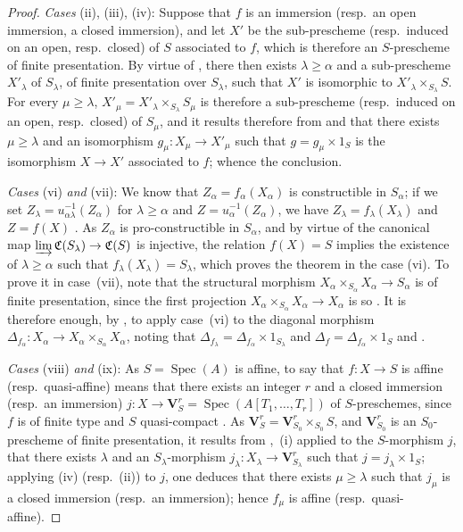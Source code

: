 \begin{proof}
\emph{Cases} (ii), (iii), (iv): Suppose that $f$ is an immersion (resp.\ an open immersion, a closed immersion), and let $X'$ be the sub-prescheme (resp.\ induced on an open, resp.\ closed) of $S$ associated to $f$, which is therefore an $S$-prescheme of finite presentation.
By virtue of , there then exists $\lambda\geqslant\alpha$ and a sub-prescheme $X'_\lambda$ of $S_\lambda$, of finite presentation over $S_\lambda$, such that $X'$ is isomorphic to $X'_\lambda\times_{S_\lambda}S$.
For every $\mu\geqslant\lambda$, $X'_\mu=X'_\lambda\times_{S_\lambda}S_\mu$ is therefore a sub-prescheme (resp.\ induced on an open, resp.\ closed) of $S_\mu$, and it results therefore from  and  that there exists $\mu\geqslant\lambda$ and an isomorphism $g_\mu:X_\mu\to X'_\mu$ such that $g=g_\mu\times 1_S$ is the isomorphism $X\to X'$ associated to $f$; whence the conclusion.

\emph{Cases} (vi) \emph{and} (vii): We know  that $Z_\alpha=f_\alpha(X_\alpha)$ is constructible in $S_\alpha$; if we set $Z_\lambda=u_{\alpha\lambda}^{-1}(Z_\alpha)$ for $\lambda\geqslant\alpha$ and $Z=u_\alpha^{-1}(Z_\alpha)$, we have $Z_\lambda=f_\lambda(X_\lambda)$ and $Z=f(X)$ .
As $Z_\alpha$ is pro-constructible in $S_\alpha$, and by virtue of  the canonical map $\varinjlim\mathfrak{C}(S_\lambda)\to\mathfrak{C}(S)$ is injective, the relation $f(X)=S$ implies the existence of $\lambda\geqslant\alpha$ such that $f_\lambda(X_\lambda)=S_\lambda$, which proves the theorem in the case (vi).
To prove it in case~(vii), note that the structural morphism $X_\alpha\times_{S_\alpha}X_\alpha\to S_\alpha$ is of finite presentation, since the first projection $X_\alpha\times_{S_\alpha}X_\alpha\to X_\alpha$ is so . It is therefore enough, by , to apply case~(vi) to the diagonal morphism $\Delta_{f_\alpha}:X_\alpha\longrightarrow X_\alpha\times_{S_\alpha}X_\alpha$,
noting that $\Delta_{f_\lambda}=\Delta_{f_\alpha}\times1_{S_\lambda}$ and $\Delta_f=\Delta_{f_\alpha}\times1_S$  and .

\emph{Cases} (viii) \emph{and} (ix): As $S=\operatorname{Spec}(A)$ is affine, to say that $f:X\to S$ is affine (resp.\ quasi-affine) means that there exists an integer $r$ and a closed immersion (resp.\ an immersion) $j:X\to\mathbf{V}^r_S=\operatorname{Spec}(A[T_1,\ldots,T_r])$ of $S$-preschemes, since $f$ is of finite type and $S$ quasi-compact .
As $\mathbf{V}^r_S=\mathbf{V}^r_{S_0}\times_{S_0}S$, and $\mathbf{V}^r_{S_0}$ is an $S_0$-prescheme of finite presentation, it results from ,~(i) applied to the $S$-morphism $j$, that there exists $\lambda$ and an $S_\lambda$-morphism $j_\lambda:X_\lambda\to\mathbf{V}^r_{S_\lambda}$ such that $j=j_\lambda\times 1_S$; applying (iv) (resp.\ (ii)) to $j$, one deduces that there exists $\mu\geqslant\lambda$ such that $j_\mu$ is a closed immersion (resp.\ an immersion); hence $f_\mu$ is affine (resp.\ quasi-affine).


\end{proof}
